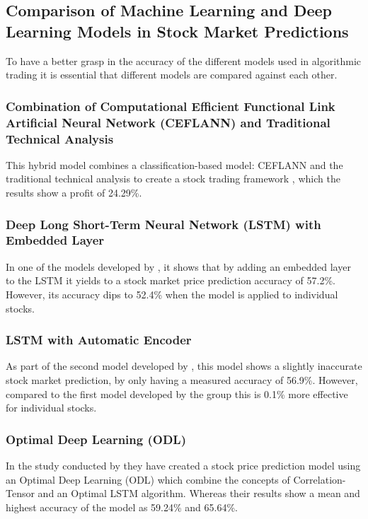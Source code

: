 \subsection{Comparison of Machine Learning and Deep Learning Models in Stock Market Predictions}
\label{subsec:comparison_ml}
To have a better grasp in the accuracy of the different models 
used in algorithmic trading it is essential that different models are 
compared against each other.

\subsubsection{Combination of Computational Efficient Functional Link Artificial Neural Network (CEFLANN) and Traditional Technical Analysis}
\label{subsubsec:ceflann}
This hybrid model combines a classification-based model: CEFLANN and 
the traditional technical analysis to create a stock trading framework 
, which the results show a profit of 24.29\%.

\subsubsection{Deep Long Short-Term Neural Network (LSTM) with Embedded Layer}
\label{subsubsec:lstm}
In one of the models developed by , 
it shows that by adding an embedded layer to the LSTM it yields to a 
stock market price prediction accuracy of 57.2\%. 
However, its accuracy dips to 52.4\% when the model is applied to individual stocks.

\subsubsection{LSTM with Automatic Encoder}
\label{subsubsec:lstm_autoencoder}
As part of the second model developed by , this model 
shows a slightly inaccurate stock market prediction, by only having 
a measured accuracy of 56.9\%. 
However, compared to the first model developed by the group this is 0.1\%
more effective for individual stocks.

\subsubsection{Optimal Deep Learning (ODL)}
\label{subsubsec:odl}
In the study conducted by  they have created a 
stock price prediction model using an Optimal Deep Learning (ODL) 
which combine the concepts of Correlation-Tensor and an Optimal LSTM algorithm. 
Whereas their results show a mean and highest accuracy of the model as 59.24\% 
and 65.64\%.

